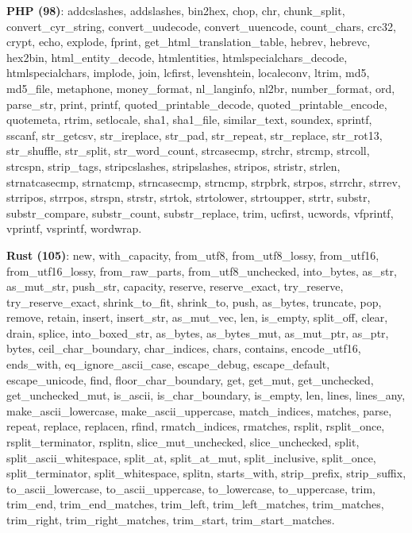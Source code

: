 \documentclass[anonymous,sigplan,review,11pt,nonacm,natbib=false]{acmart}
\begin{document}
    \textbf{PHP (98)}: addcslashes, addslashes, bin2hex, chop, chr, chunk\_split, convert\_cyr\_string, convert\_uudecode, convert\_uuencode, count\_chars, crc32, crypt, echo, explode, fprint, get\_html\_translation\_table, hebrev, hebrevc, hex2bin, html\_entity\_decode, htmlentities, htmlspecialchars\_decode, htmlspecialchars, implode, join, lcfirst, levenshtein, localeconv, ltrim, md5, md5\_file, metaphone, money\_format, nl\_langinfo, nl2br, number\_format, ord, parse\_str, print, printf, quoted\_printable\_decode, quoted\_printable\_encode, quotemeta, rtrim, setlocale, sha1, sha1\_file, similar\_text, soundex, sprintf, sscanf, str\_getcsv, str\_ireplace, str\_pad, str\_repeat, str\_replace, str\_rot13, str\_shuffle, str\_split, str\_word\_count, strcasecmp, strchr, strcmp, strcoll, strcspn, strip\_tags, stripcslashes, stripslashes, stripos, stristr, strlen, strnatcasecmp, strnatcmp, strncasecmp, strncmp, strpbrk, strpos, strrchr, strrev, strripos, strrpos, strspn, strstr, strtok, strtolower, strtoupper, strtr, substr, substr\_compare, substr\_count, substr\_replace, trim, ucfirst, ucwords, vfprintf, vprintf, vsprintf, wordwrap.

    \textbf{Rust (105)}: new, with\_capacity, from\_utf8, from\_utf8\_lossy, from\_utf16, from\_utf16\_lossy, from\_raw\_parts, from\_utf8\_unchecked, into\_bytes, as\_str, as\_mut\_str, push\_str, capacity, reserve, reserve\_exact, try\_reserve, try\_reserve\_exact, shrink\_to\_fit, shrink\_to, push, as\_bytes, truncate, pop, remove, retain, insert, insert\_str, as\_mut\_vec, len, is\_empty, split\_off, clear, drain, splice, into\_boxed\_str, as\_bytes, as\_bytes\_mut, as\_mut\_ptr, as\_ptr, bytes, ceil\_char\_boundary, char\_indices, chars, contains, encode\_utf16, ends\_with, eq\_ignore\_ascii\_case, escape\_debug, escape\_default, escape\_unicode, find, floor\_char\_boundary, get, get\_mut, get\_unchecked, get\_unchecked\_mut, is\_ascii, is\_char\_boundary, is\_empty, len, lines, lines\_any, make\_ascii\_lowercase, make\_ascii\_uppercase, match\_indices, matches, parse, repeat, replace, replacen, rfind, rmatch\_indices, rmatches, rsplit, rsplit\_once, rsplit\_terminator, rsplitn, slice\_mut\_unchecked, slice\_unchecked, split, split\_ascii\_whitespace, split\_at, split\_at\_mut, split\_inclusive, split\_once, split\_terminator, split\_whitespace, splitn, starts\_with, strip\_prefix, strip\_suffix, to\_ascii\_lowercase, to\_ascii\_uppercase, to\_lowercase, to\_uppercase, trim, trim\_end, trim\_end\_matches, trim\_left, trim\_left\_matches, trim\_matches, trim\_right, trim\_right\_matches, trim\_start, trim\_start\_matches.
\end{document}
